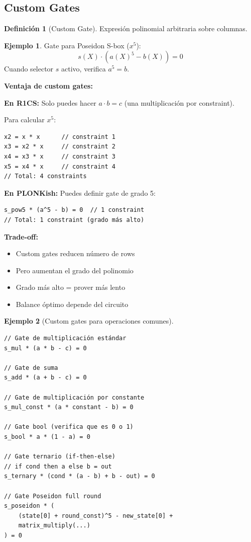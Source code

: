 \documentclass[11pt,a4paper,twoside,openright]{book}
\theoremstyle{definition}
\newtheorem{definition}{Definición}[chapter]
\newtheorem{example}{Ejemplo}[chapter]
\theoremstyle{plain}
\theoremstyle{remark}
\begin{document}
\subsection{Custom Gates}

\begin{definition}[Custom Gate]
Expresión polinomial arbitraria sobre columnas.
\end{definition}

\begin{example}
Gate para Poseidon S-box ($x^5$):
\[
s(X) \cdot (a(X)^5 - b(X)) = 0
\]
Cuando selector $s$ activo, verifica $a^5 = b$.
\end{example}

\begin{keyidea}
\textbf{Ventaja de custom gates:}

\textbf{En R1CS:} Solo puedes hacer $a \cdot b = c$ (una multiplicación por constraint).

Para calcular $x^5$:
\begin{verbatim}
x2 = x * x      // constraint 1
x3 = x2 * x     // constraint 2
x4 = x3 * x     // constraint 3
x5 = x4 * x     // constraint 4
// Total: 4 constraints
\end{verbatim}

\textbf{En PLONKish:} Puedes definir gate de grado 5:
\begin{verbatim}
s_pow5 * (a^5 - b) = 0  // 1 constraint
// Total: 1 constraint (grado más alto)
\end{verbatim}

\textbf{Trade-off:}
\begin{itemize}
    \item Custom gates reducen número de rows
    \item Pero aumentan el grado del polinomio
    \item Grado más alto = prover más lento
    \item Balance óptimo depende del circuito
\end{itemize}
\end{keyidea}

\begin{example}[Custom gates para operaciones comunes]
\begin{verbatim}
// Gate de multiplicación estándar
s_mul * (a * b - c) = 0

// Gate de suma
s_add * (a + b - c) = 0

// Gate de multiplicación por constante
s_mul_const * (a * constant - b) = 0

// Gate bool (verifica que es 0 o 1)
s_bool * a * (1 - a) = 0

// Gate ternario (if-then-else)
// if cond then a else b = out
s_ternary * (cond * (a - b) + b - out) = 0

// Gate Poseidon full round
s_poseidon * (
    (state[0] + round_const)^5 - new_state[0] +
    matrix_multiply(...)
) = 0
\end{verbatim}
\end{example}
\end{document}
